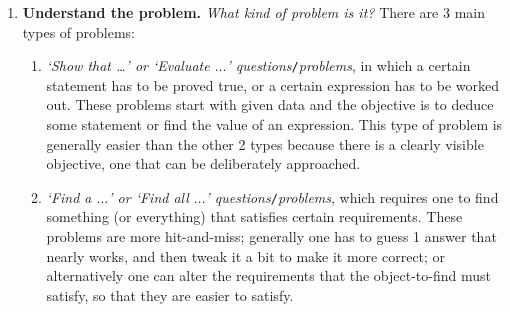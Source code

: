 \documentclass[oneside]{book}
\numberwithin{equation}{section}
\begin{document}
\begin{enumerate}
	\item \textbf{Understand the problem.} \textit{What kind of problem is it?} There are 3 main types of problems:
	\begin{enumerate}
		\item \textit{`Show that \ldots' or `Evaluate $\ldots$' questions}\texttt{/}\textit{problems}, in which a certain statement has to be proved true, or a certain expression has to be worked out. These problems start with given data and the objective is to deduce some statement or find the value of an expression. This type of problem is generally easier than the other 2 types because there is a clearly visible objective, one that can be deliberately approached.
		\item \textit{`Find a $\ldots$' or `Find all $\ldots$' questions}\texttt{/}\textit{problems}, which requires one to find something (or everything) that satisfies certain requirements. These problems are more hit-and-miss; generally one has to guess 1 answer that nearly works, and then tweak it a bit to make it more correct; or alternatively one can alter the requirements that the object-to-find must satisfy, so that they are easier to satisfy.
		

\end{enumerate}
\end{enumerate}
\end{document}
